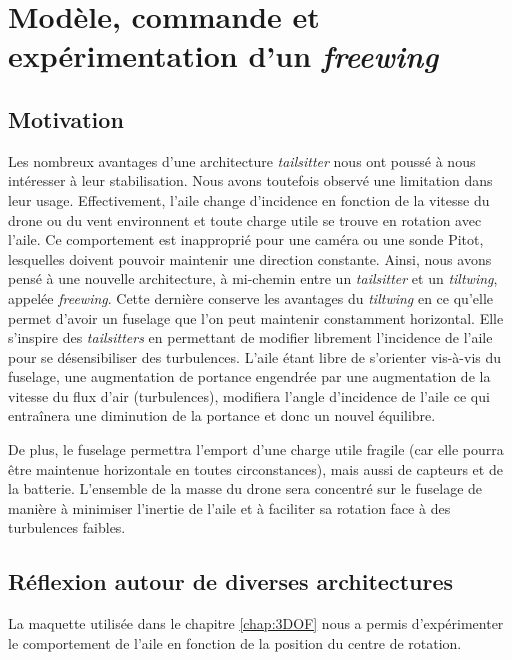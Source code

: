 
\chapter{Modèle, commande et expérimentation d'un \textit{freewing}}
\minitoc
\label{chap:colibri}



\section{Motivation}
\label{sec:motivationcolibri}
Les nombreux avantages d'une architecture \textit{tailsitter} nous ont poussé à nous intéresser à leur stabilisation. Nous avons toutefois observé une limitation dans leur usage. Effectivement, l'aile change d'incidence en fonction de la vitesse du drone ou du vent environnent et toute charge utile se trouve en rotation avec l'aile. Ce comportement est inapproprié pour une caméra ou une sonde Pitot, lesquelles doivent pouvoir maintenir une direction constante. Ainsi, nous avons pensé à une nouvelle architecture, à mi-chemin entre un \textit{tailsitter} et un \textit{tiltwing}, appelée \textit{freewing}. Cette dernière conserve les avantages du \textit{tiltwing} en ce qu'elle permet d'avoir un fuselage que l'on peut maintenir constamment horizontal. Elle s'inspire des \textit{tailsitters} en permettant de modifier librement l'incidence de l'aile pour se désensibiliser des turbulences. L'aile étant libre de s'orienter vis-à-vis du fuselage, une augmentation de portance engendrée par une augmentation de la vitesse du flux d'air (turbulences), modifiera l'angle d'incidence de l'aile ce qui entraînera une diminution de la portance et donc un nouvel équilibre.

De plus, le fuselage permettra l'emport d'une charge utile fragile (car elle pourra être maintenue horizontale en toutes circonstances), mais aussi de capteurs et de la batterie. L'ensemble de la masse du drone sera concentré sur le fuselage de manière à minimiser l'inertie de l'aile et à faciliter sa rotation face à des turbulences faibles.

\section{Réflexion autour de diverses architectures}

La maquette utilisée dans le chapitre \ref{chap:3DOF} nous a permis d'expérimenter le comportement de l'aile en fonction de la position du centre de rotation.

